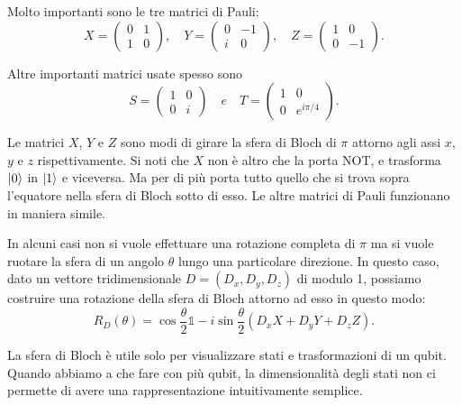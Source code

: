 Molto importanti sono le tre matrici di Pauli: 
\begin{equation}
    X=\begin{pmatrix}
        0&1\\1&0
    \end{pmatrix},
    \quad Y = \begin{pmatrix}
        0&-1 \\ i&0
    \end{pmatrix},
    \quad Z = \begin{pmatrix}
        1&0 \\ 0&-1
    \end{pmatrix}.
\end{equation}

Altre importanti matrici usate spesso sono 
\begin{equation}
    S=\begin{pmatrix}
        1&0\\0&i
    \end{pmatrix}
    \quad e \quad T = \begin{pmatrix}
        1&0\\0&e^{i\pi/4}
    \end{pmatrix}.
\end{equation}

Le matrici $X$, $Y$ e $Z$ sono modi di girare la 
sfera di Bloch di $\pi$ attorno agli assi $x$, $y$ e $z$ rispettivamente. 
Si noti che $X$ non è altro che la porta NOT, e trasforma $\ket{0}$ in $\ket{1}$ 
e viceversa. Ma per di più porta tutto quello che si trova sopra l'equatore nella 
sfera di Bloch sotto di esso. Le altre matrici di Pauli funzionano in maniera simile. 

In alcuni casi non si vuole effettuare una rotazione completa di $\pi$ 
ma si vuole ruotare la sfera di un angolo $\theta$ lungo una particolare direzione. 
In questo caso, dato un vettore tridimensionale $D=(D_x, D_y, D_z)$ di modulo 1, 
possiamo costruire una rotazione della sfera di Bloch attorno ad esso in questo 
modo: 
\begin{equation}
    R_D(\theta)=\cos\frac{\theta}{2}\mathbb{1} - i \sin \frac{\theta}{2} 
    (D_x X + D_y Y + D_z Z). 
\end{equation}

La sfera di Bloch è utile solo per visualizzare stati e trasformazioni di un qubit. 
Quando abbiamo a che fare con più qubit, la dimensionalità degli stati non ci 
permette di avere una rappresentazione intuitivamente semplice. 

